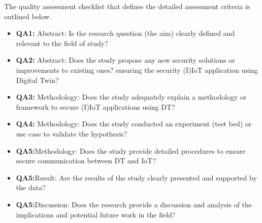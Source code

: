 The quality assessment checklist that defines the detailed assessment criteria is outlined below.
\begin{itemize}
    \item \textbf{QA1:} Abstract: Is the research question (the aim) clearly defined and relevant to the field of study?
    \item \textbf{QA2:} Abstract: Does the study propose any new security solutions or improvements to existing ones? ensuring the security (I)IoT application using Digital Twin?
    \item \textbf{QA3:} Methodology: Does the study adequately explain a methodology or framework to secure (I)IoT applications using DT?
    \item \textbf{QA4:} Methodology: Does the study conducted an experiment (test bed) or use case to validate the hypothesis?
    \item \textbf{QA5:}Methodology: Does the study provide detailed procedures to ensure secure communication between DT and IoT?
    \item \textbf{QA5:}Result: Are the results of the study clearly presented and supported by the data?
    \item \textbf{QA5:}Discussion: Does the research provide a discussion and analysis of the implications and potential future work in the field?
\end{itemize}

